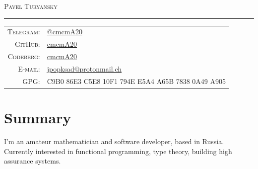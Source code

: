 \documentclass[a4paper,11pt]{article}
\begin{document}
  \begin{center}
    \Huge \textsc{Pavel Turyansky}
  \end{center}

  \hrule
  \vspace{0.5em}

  \begin{tabular}{rl}
    \textsc{Telegram:}  & \href{https://t.me/cmcmA20}{@cmcmA20}                         \\
    \textsc{GitHub:}    & \href{https://github.com/cmcmA20}{cmcmA20}                    \\
    \textsc{Codeberg:}  & \href{https://codeberg.org/cmcmA20}{cmcmA20}                  \\
    \textsc{E-mail:}    & \href{mailto:jpopksad@protonmail.ch}{jpopksad@protonmail.ch}  \\
    \textsc{GPG:}       & C9B0 86E3 C5E8 10F1 794E  E5A4 A65B 7838 0A49 A905            \\
  \end{tabular}

  \section{Summary}
    I'm an amateur mathematician and software developer, based in Russia. Currently interested in functional
    programming, type theory, building high assurance systems.
\end{document}
